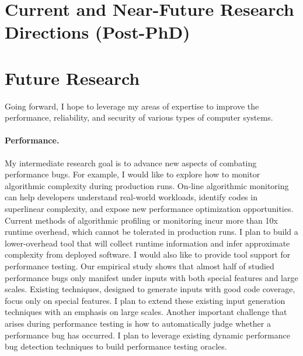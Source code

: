 \documentclass[10pt]{article}
\begin{document}

\vspace{-.1in}
\section{Current and Near-Future Research Directions (Post-PhD)}


\section{Future Research}

Going forward, I hope to leverage my areas of expertise to improve the performance, 
reliability, and security of various types of computer systems. 

\vspace{-.1in}
\paragraph{Performance.} 
My intermediate research goal is to advance new aspects of combating performance bugs.
For example, I would like to explore how to monitor algorithmic complexity during production runs. 
On-line algorithmic monitoring can help developers understand real-world workloads, 
identify codes in superlinear complexity, 
and expose new performance optimization opportunities. 
Current methods of algorithmic profiling or monitoring incur more than 10x runtime overhead, which cannot be tolerated in production runs. 
I plan to build a lower-overhead tool that will collect runtime information 
and infer approximate complexity from deployed software. 
I would also like to provide tool support for performance testing.
Our empirical study shows that almost half of studied performance bugs only manifest 
under inputs with both special features and large scales.
Existing techniques, designed to generate inputs with good code coverage, focus only on special features.
I plan to extend these existing input generation techniques with an emphasis on large scales. 
Another important challenge that arises during performance testing is how to automatically judge whether a performance bug has occurred. 
I plan to leverage existing dynamic performance bug detection techniques to build performance testing oracles.

\vspace{-.1in}
\end{document}
